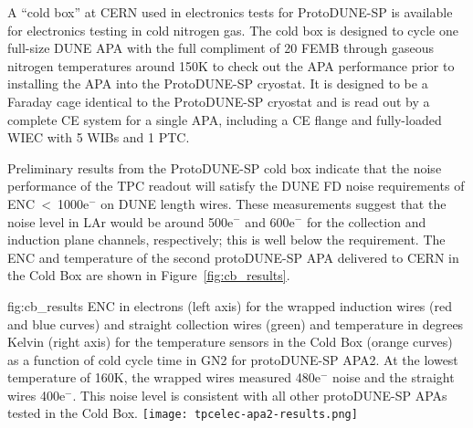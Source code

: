A ``cold box'' at CERN used in electronics tests for ProtoDUNE-SP is available for electronics testing in cold nitrogen gas. The cold box is designed to cycle one full-size DUNE APA with the full compliment of 20 FEMB through gaseous nitrogen temperatures around 150K to check out the APA performance prior to installing the APA into the ProtoDUNE-SP cryostat. It is designed to be a Faraday cage identical to the ProtoDUNE-SP cryostat and is read out by a complete CE system for a single APA, including a CE flange and fully-loaded WIEC with 5 WIBs and 1 PTC.

Preliminary results from the ProtoDUNE-SP cold box indicate that
the noise performance of the TPC readout will satisfy the DUNE FD noise requirements of
ENC~<~1000e$^-$ on DUNE length wires. These measurements suggest that the noise level in
LAr would be around 500e$^-$ and 600e$^-$ for the collection and induction plane channels,
respectively; this is well below the requirement.  The ENC and temperature of the second protoDUNE-SP
APA delivered to CERN in the
Cold Box are shown in Figure~\ref{fig:cb_results}.

\begin{dunefigure}
{fig:cb_results}
{ENC in electrons (left axis) for the wrapped induction wires (red and blue curves) and 
straight collection wires (green) and temperature in degrees Kelvin (right axis) for the temperature
sensors in the Cold Box (orange curves) as a function of cold cycle time in GN2 for protoDUNE-SP APA2. 
At the lowest temperature of 160K, the wrapped wires measured 480e$^-$ noise and the straight 
wires 400e$^-$. This noise level is consistent with all other protoDUNE-SP APAs tested in the Cold Box.}
\texttt{[image: tpcelec-apa2-results.png]}
\end{dunefigure}
